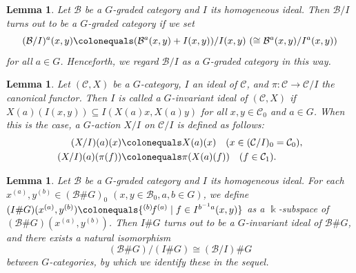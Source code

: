 \documentclass{surv-l}
\numberwithin{equation}{chapter}
\numberwithin{figure}{chapter}
\theoremstyle{plain}
\newtheorem{lem}[thm]{Lemma}
\theoremstyle{definition}
\theoremstyle{remark}
\def\smor(#1,#2,#3){{}^{(#1)}\!#2^{(#3)}}
\begin{document}
\begin{lem}
Let $\mathcal{B}$ be a $G$-graded category and $I$ its homogeneous ideal.
Then $\mathcal{B}/I$ turns out to be a $G$-graded category
if we set
\[
(\mathcal{B}/I)^a(x, y)\colonequals  (\mathcal{B}^a(x, y)+I(x, y))/I(x, y)\ (\cong \mathcal{B}^a(x, y)/I^a(x, y))
\]
for all $a \in G$.
Henceforth, we regard $\mathcal{B}/I$ as a $G$-graded category in this way.
\end{lem}

\begin{lem}\label{lem:induced-action}
Let $({\mathcal{C}}, X)$ be a $G$-category, $I$ an ideal of ${\mathcal{C}}$, and
$\pi \colon {\mathcal{C}} \to {\mathcal{C}}/I$ the canonical functor.
Then $I$ is called a $G$-\emph{invariant ideal} of $({\mathcal{C}}, X)$ if
$X(a)(I(x, y)) \subseteq I(X(a)x, X(a)y)$ for all
$x, y \in {\mathcal{C}}_0$ and $a \in G$.
When this is the case,
a $G$-action $X/I$ on ${\mathcal{C}}/I$ is defined as follows:
\begin{equation}\label{eq:induced-action}
\begin{aligned}
(X/I)(a)(x) &\colonequals  X(a)(x)\quad (x \in ({\mathcal{C}}/I)_0 = {\mathcal{C}}_0),\\
(X/I)(a)(\pi(f)) &\colonequals  \pi(X(a)(f))\quad (f \in {\mathcal{C}}_1).
\end{aligned}
\end{equation}
\end{lem}

\begin{lem}\label{lem:factor-alg-smash}
Let $\mathcal{B}$ be a $G$-graded category and $I$ its homogeneous ideal.
For each $x^{(a)}, y^{(b)} \in (\mathcal{B}\# G)_0$ $(x, y \in \mathcal{B}_0, a, b \in G)$,
we define
$(I\#G)(x^{(a)}, y^{(b)})\colonequals  \{ \smor(b,f,a) \mid f \in I^{b^{-1} a}(x, y)\}$
as a $\Bbbk$-subspace of $(\mathcal{B}\#G)(x^{(a)}, y^{(b)})$.
Then $I\# G$ turns out to be a $G$-invariant ideal of $\mathcal{B}\# G$,
and there exists a natural isomorphism
\begin{equation*}
(\mathcal{B}\# G)/(I\# G) \cong (\mathcal{B}/I)\# G
\end{equation*}
between $G$-categories, by which we identify these in the sequel.
\end{lem}
\end{document}
